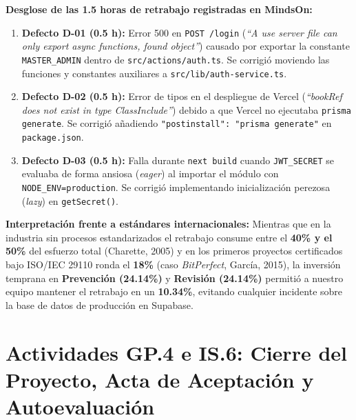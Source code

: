 \documentclass[11pt,a4paper]{article}
\begin{document}
\textbf{Desglose de las 1.5 horas de retrabajo registradas en MindsOn:}
\begin{enumerate}[noitemsep]
  \item \textbf{Defecto D-01 (0.5 h):} Error 500 en \texttt{POST /login} (\textit{``A use server file can only export async functions, found object''}) causado por exportar la constante \texttt{MASTER\_ADMIN} dentro de \texttt{src/actions/auth.ts}. Se corrigió moviendo las funciones y constantes auxiliares a \texttt{src/lib/auth-service.ts}.
  \item \textbf{Defecto D-02 (0.5 h):} Error de tipos en el despliegue de Vercel (\textit{``bookRef does not exist in type ClassInclude''}) debido a que Vercel no ejecutaba \texttt{prisma generate}. Se corrigió añadiendo \texttt{"postinstall": "prisma generate"} en \texttt{package.json}.
  \item \textbf{Defecto D-03 (0.5 h):} Falla durante \texttt{next build} cuando \texttt{JWT\_SECRET} se evaluaba de forma ansiosa (\textit{eager}) al importar el módulo con \texttt{NODE\_ENV=production}. Se corrigió implementando inicialización perezosa (\textit{lazy}) en \texttt{getSecret()}.
\end{enumerate}

\textbf{Interpretación frente a estándares internacionales:} Mientras que en la industria sin procesos estandarizados el retrabajo consume entre el \textbf{40\% y el 50\%} del esfuerzo total (Charette, 2005) y en los primeros proyectos certificados bajo ISO/IEC 29110 ronda el \textbf{18\%} (caso \textit{BitPerfect}, García, 2015), la inversión temprana en \textbf{Prevención (24.14\%)} y \textbf{Revisión (24.14\%)} permitió a nuestro equipo mantener el retrabajo en un \textbf{10.34\%}, evitando cualquier incidente sobre la base de datos de producción en Supabase.

\section{Actividades GP.4 e IS.6: Cierre del Proyecto, Acta de Aceptación y Autoevaluación}
\end{document}
